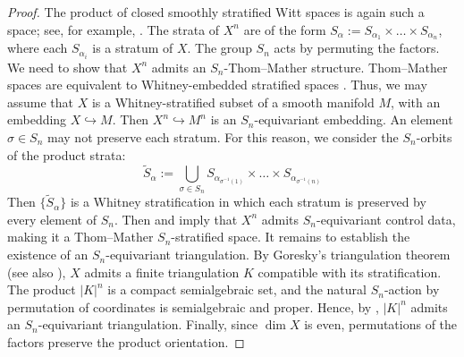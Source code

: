 \documentclass[11pt,leqno,twoside]{amsart}
\theoremstyle{plainsl}
\theoremstyle{definition}
\begin{document}
\begin{proof}
The product of closed smoothly stratified Witt spaces is again such a space; see, for example, \cite[Corollary~5.18]{ABP1}. The strata of $X^n$ are of the form
$S_{\alpha}:=S_{\alpha_1}\times\ldots\times S_{\alpha_n}$,
where each $S_{\alpha_i}$ is a stratum of $X$. The group $S_n$ acts by permuting the factors.
We need to show that $X^n$ admits an $S_n$-Thom--Mather structure. 
Thom--Mather spaces are equivalent to Whitney-embedded stratified spaces \cite[\S 2.4]{ABP1}. Thus, we may assume that $X$ is a Whitney-stratified subset of a smooth manifold $M$, with an embedding $X\hookrightarrow M$. Then $X^n\hookrightarrow M^n$ is an $S_n$-equivariant embedding.
An element $\sigma\in S_n$ may not preserve each stratum. For this reason, we consider the $S_n$-orbits of the product strata:
\[
\tilde{S}_{\alpha}:=\bigcup_{\sigma \in S_n} S_{\alpha_{\sigma^{-1}(1)}}\times \ldots\times S_{\alpha_{\sigma^{-1}(n)}}
\]
Then $\{\tilde{S}_{\alpha}\}$ is a Whitney stratification in which each stratum is preserved by every element of $S_n$. Then \cite[Thm.~2.2]{BLP} and \cite[Thm.~2.12]{PW} imply that $X^n$ admits $S_n$-equivariant control data, making it a Thom--Mather $S_n$-stratified space.
It remains to establish the existence of an
$S_n$-equivariant triangulation. By Goresky's
triangulation theorem \cite{G} (see also
\cite[Proposition~4.5]{ABP1}), $X$ admits a
finite triangulation $K$ compatible with its
stratification. The product $|K|^n$ is a compact semialgebraic
set, and the natural $S_n$-action by permutation
of coordinates is semialgebraic and proper.
Hence, by \cite[Prop.~6.7]{BLP},
$|K|^n$ admits an $S_n$-equivariant
triangulation.
Finally, since $\dim X$ is even, permutations
of the factors preserve the product orientation.
\end{proof}
\end{document}
